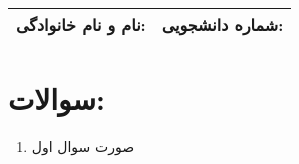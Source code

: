 \documentclass[12pt,a4paper]{article}
\begin{document}
	
	\begin{tabular}{|p{7cm}|p{7cm}|}
		\hline
		\textbf{نام و نام خانوادگی:} & \textbf{شماره دانشجویی:} \\
		\hline
	\end{tabular}
	
	\section*{سوالات:}
	
	\begin{enumerate}
		\item 
		صورت سوال اول
		
		
	\end{enumerate}
	
\end{document}

